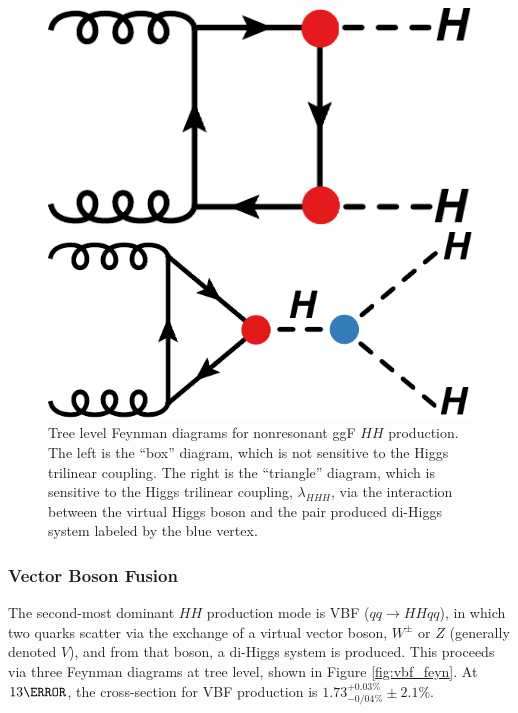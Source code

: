 \begin{figure}[!thp]
    \centering
    \begin{minipage}[c]{.40\textwidth}
        \includegraphics[width=\textwidth]{chapters/chapter1_theory/images/hh_box.pdf}
    \end{minipage}
    \hspace{0.09\textwidth}
    \begin{minipage}[c]{.40\textwidth}
        \includegraphics[width=\textwidth]{chapters/chapter1_theory/images/hh_triangle.pdf}
    \end{minipage}

    \caption[Tree level Feynman diagrams for nonresonant \gls{ggF} $HH$ production]{Tree level Feynman diagrams for nonresonant \gls{ggF} $HH$ production. The left is the ``box'' diagram, which is not sensitive to the Higgs trilinear coupling. The right is the ``triangle'' diagram, which is sensitive to the Higgs trilinear coupling, $\lambda_{HHH}$, via the interaction between the virtual Higgs boson and the pair produced di-Higgs system labeled by the blue vertex.}
    \label{fig:ggf_feyn}
\end{figure}

\subsubsection{Vector Boson Fusion} \label{sssec:vbfHH}
The second-most dominant $HH$ production mode is \gls{VBF} ($qq \rightarrow HHqq$), in which two quarks scatter via the exchange of a virtual vector boson, $W^\pm$ or $Z$ (generally denoted $V$), and from that boson, a di-Higgs system is produced. This proceeds via three Feynman diagrams at tree level, shown in Figure \ref{fig:vbf_feyn}. At $\unit{13}{\TeV}$, the cross-section for \gls{VBF} production is $1.73^{+0.03\%}_{-0/04\%} \pm 2.1\%$\cite{hh-crosssections}.

